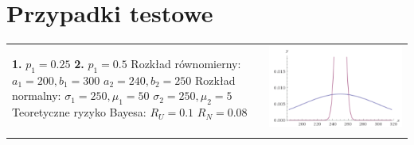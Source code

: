 \pagebreak
\section{Przypadki testowe}
\newcommand{\specialcell}[2][c]{
  \begin{tabular}[#1]{@{}l@{}}#2\end{tabular}}
	
	\graphicspath{{obrazki/}}
	
	\begin{longtable}{ p{} p{} }
	
	
	
	\specialcell{
	\textbf{1.} $p_1 = 0.25$  \\
	\textbf{2.} $p_1 = 0.5$ \\
	Rozkład równomierny: \\ 
	$a_1 = 200, b_1 = 300$ \\
	$a_2 = 240, b_2 = 250$ \\
	Rozkład normalny: \\
	$\sigma_1 = 250, \mu_1 = 50$ \\
	$\sigma_2 = 250, \mu_2 = 5$ \\
	Teoretyczne ryzyko Bayesa: \\
	$R_U = 0.1$ \\
	$R_N = 0.08$ \\
	} & \parbox[c]{1cm}{\includegraphics[width=.50\textwidth,trim=0 0 0 -5]{1.png}}\\
	
	\\
	 

\end{longtable}
